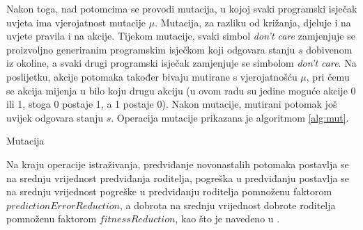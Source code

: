 \documentclass[times, utf8, zavrsni]{fer}
\begin{document}
Nakon toga, nad potomcima se provodi mutacija, u kojoj svaki programski isječak uvjeta ima vjerojatnost mutacije $\mu$.
Mutacija, za razliku od križanja, djeluje i na uvjete pravila i na akcije.
Tijekom mutacije, svaki simbol \emph{don't care} zamjenjuje se proizvoljno generiranim programskim isječkom koji odgovara stanju $s$ dobivenom iz okoline, a svaki drugi programski isječak zamjenjuje se simbolom \emph{don't care}.
Na poslijetku, akcije potomaka također bivaju mutirane s vjerojatnošću $\mu$, pri čemu se akcija mijenja u bilo koju drugu akciju (u ovom radu su jedine moguće akcije 0 ili 1, stoga 0 postaje 1, a 1 postaje 0).
Nakon mutacije, mutirani potomak još uvijek odgovara stanju $s$.
Operacija mutacije prikazana je algoritmom \ref{alg:mut}.
\begin{algorithm}[h]
    \caption{Mutacija}
    \label{alg:mut}
    \begin{algorithmic}
        \STATE{$r :=$ proizvoljan decimalni broj iz intervala [0, 1)}
        \REPEAT
        \ELSE
        \ENDIF
        \ENDIF
        \ENDFOR
        \STATE{$r :=$ proizvoljan decimalni broj iz intervala [0, 1)}
        \ENDIF
    \end{algorithmic}
\end{algorithm}

Na kraju operacije istraživanja, predviđanje novonastalih potomaka postavlja se na srednju vrijednost predviđanja roditelja, pogreška u predviđanju postavlja se na srednju vrijednost pogreške u predviđanju roditelja pomnoženu faktorom $predictionErrorReduction$, a dobrota na srednju vrijednost dobrote roditelja pomnoženu faktorom $fitnessReduction$, kao što je navedeno u \citep{4}.
\end{document}
